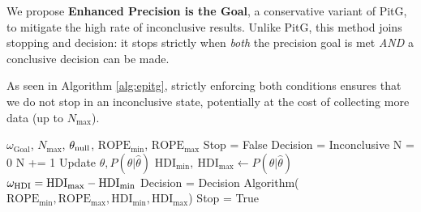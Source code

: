 We propose \textbf{Enhanced Precision is the Goal}, a conservative variant of PitG,
to mitigate the high rate of inconclusive results. Unlike PitG, this method joins stopping
and decision: it stops strictly when \textit{both} the precision goal is met \textit{AND}
a conclusive decision can be made.


As seen in Algorithm \ref{alg:epitg}, strictly enforcing both conditions ensures that we do not stop in an inconclusive state, potentially at the cost of collecting more data (up to $N_\mathrm{max}$).

\begin{algorithm}
    \caption{Enhanced Precision is the Goal}\label{alg:epitg}
    \begin{algorithmic}
    \Require $\omega_\mathrm{Goal}$, $N_\mathrm{max}$, $\theta_{\rm null}$, $\mathrm{ROPE}_\mathrm{min}$, $\mathrm{ROPE}_\mathrm{max}$
    \State Stop = False
    \State Decision = Inconclusive
    \State N = 0
    \State N += 1 
    \State Update $\hat\theta, P(\theta|\hat\theta)$ 
    \State $\mathrm{HDI}_\mathrm{min}, \ \mathrm{HDI}_\mathrm{max}  \gets P(\theta|\hat\theta)$ 
    \State $\omega_{\rm HDI} = \mathrm{HDI}_\mathrm{max} - \mathrm{HDI}_\mathrm{min}$
        \State Decision = Decision Algorithm($\mathrm{ROPE}_\mathrm{min}, \mathrm{ROPE}_\mathrm{max}, \mathrm{HDI}_\mathrm{min}, \mathrm{HDI}_\mathrm{max}$) 
            \State \HiLi Stop = True 
        \EndIf
    \EndIf
    \EndWhile
    \end{algorithmic}
\end{algorithm}

